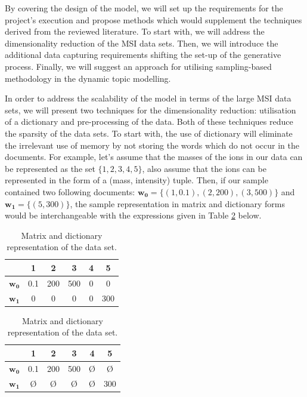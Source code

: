\documentclass{mprop}
\begin{document}
\par By covering the design of the model, we will set up the requirements for the project's execution and propose methods which would supplement the techniques derived from the reviewed literature. To start with, we will address the dimensionality reduction of the MSI data sets. Then, we will introduce the additional data capturing requirements shifting the set-up of the generative process. Finally, we will suggest an approach for utilising sampling-based methodology in the dynamic topic modelling. 

\par In order to address the scalability of the model in terms of the large MSI data sets, we will present two techniques for the dimensionality reduction: utilisation of a dictionary and pre-processing of the data. Both of these techniques reduce the sparsity of the data sets. To start with, the use of dictionary will eliminate the irrelevant use of memory by not storing the words which do not occur in the documents. For example, let's assume that the masses of the ions in our data can be represented as the set $\{1, 2, 3, 4, 5\}$, also assume that the ions can be represented in the form of a (mass, intensity) tuple. Then, if our sample contained two following documents: $\mathbf{w_0} = \{(1, 0.1), (2, 200), (3, 500)\}$ and $\mathbf{w_1} = \{(5, 300)\}$, the sample representation in matrix and dictionary forms would be interchangeable with the expressions given in Table \ref{tab:m_and_d} below.
\begin{table}[H]
\begin{center}
\begin{tabular}{|c||c|c|c|c|c|}
\hline
&1&2&3&4&5\\
\hline
$\mathbf{w_0}$&0.1&200&500&0&0\\
$\mathbf{w_1}$&0&0&0&0&300\\
\hline
\end{tabular}
\quad
\begin{tabular}{|c||c|c|c|c|c|}
\hline
&1&2&3&4&5\\
\hline
$\mathbf{w_0}$&0.1&200&500&\O&\O\\
$\mathbf{w_1}$&\O&\O&\O&\O&300\\
\hline
\end{tabular}
\end{center}
\caption{Matrix and dictionary representation of the data set.}
\label{tab:m_and_d}
\end{table}
\end{document}
